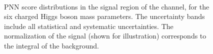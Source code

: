 		\begin{figure}
		  \centering
			 \\
			  \caption{\label{fig:taumu_SR_PNNscores_app_6} \gls{PNN} score distributions in the
			signal region of the \taumu channel, for the six charged Higgs boson mass parameters.
			 The uncertainty bands include all statistical and systematic uncertainties. 
			The normalization of the signal (shown for illustration) corresponds to the integral of the background.}
		\end{figure}
